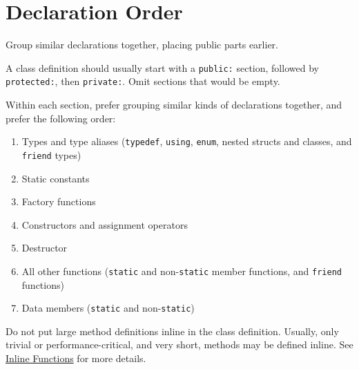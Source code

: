 
\section{Declaration Order}\label{sec:declaration-order}
Group similar declarations together, placing public parts earlier.

A class definition should usually start with a \texttt{public:} section, followed by \texttt{protected:}, then \texttt{private:}. Omit sections that would be empty.

Within each section, prefer grouping similar kinds of declarations together, and prefer the following order:
\begin{enumerate}
    \item Types and type aliases (\texttt{typedef}, \texttt{using}, \texttt{enum}, nested structs and classes, and \texttt{friend} types)
    \item Static constants
    \item Factory functions
    \item Constructors and assignment operators
    \item Destructor
    \item All other functions (\texttt{static} and non-\texttt{static} member functions, and \texttt{friend} functions)
    \item Data members (\texttt{static} and non-\texttt{static})
\end{enumerate}

Do not put large method definitions inline in the class definition. Usually, only trivial or performance-critical, and very short, methods may be defined inline. See \hyperref[sec:inline-functions]{Inline Functions} for more details.

